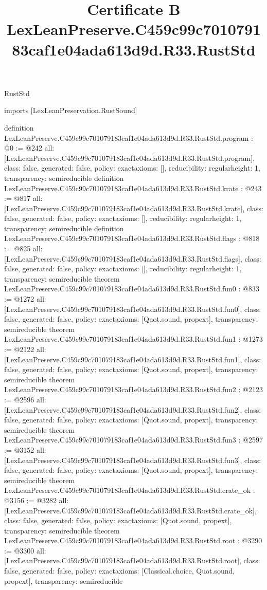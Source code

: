 \begin{lexlean}{RustStd}
\title{Certificate B LexLeanPreserve.C459c99c701079183caf1e04ada613d9d.R33.RustStd}
\begin{coremodule}
imports [LexLeanPreservation.RustSound]

definition LexLeanPreserve.C459c99c701079183caf1e04ada613d9d.R33.RustStd.program : @0 := @242 {
  all: [LexLeanPreserve.C459c99c701079183caf1e04ada613d9d.R33.RustStd.program],
  class: false,
  generated: false,
  policy: exact{axioms: []},
  reducibility: regular{height: 1},
  transparency: semireducible
}
definition LexLeanPreserve.C459c99c701079183caf1e04ada613d9d.R33.RustStd.krate : @243 := @817 {
  all: [LexLeanPreserve.C459c99c701079183caf1e04ada613d9d.R33.RustStd.krate],
  class: false,
  generated: false,
  policy: exact{axioms: []},
  reducibility: regular{height: 1},
  transparency: semireducible
}
definition LexLeanPreserve.C459c99c701079183caf1e04ada613d9d.R33.RustStd.flags : @818 := @825 {
  all: [LexLeanPreserve.C459c99c701079183caf1e04ada613d9d.R33.RustStd.flags],
  class: false,
  generated: false,
  policy: exact{axioms: []},
  reducibility: regular{height: 1},
  transparency: semireducible
}
theorem LexLeanPreserve.C459c99c701079183caf1e04ada613d9d.R33.RustStd.fun0 : @833 := @1272 {
  all: [LexLeanPreserve.C459c99c701079183caf1e04ada613d9d.R33.RustStd.fun0],
  class: false,
  generated: false,
  policy: exact{axioms: [Quot.sound, propext]},
  transparency: semireducible
}
theorem LexLeanPreserve.C459c99c701079183caf1e04ada613d9d.R33.RustStd.fun1 : @1273 := @2122 {
  all: [LexLeanPreserve.C459c99c701079183caf1e04ada613d9d.R33.RustStd.fun1],
  class: false,
  generated: false,
  policy: exact{axioms: [Quot.sound, propext]},
  transparency: semireducible
}
theorem LexLeanPreserve.C459c99c701079183caf1e04ada613d9d.R33.RustStd.fun2 : @2123 := @2596 {
  all: [LexLeanPreserve.C459c99c701079183caf1e04ada613d9d.R33.RustStd.fun2],
  class: false,
  generated: false,
  policy: exact{axioms: [Quot.sound, propext]},
  transparency: semireducible
}
theorem LexLeanPreserve.C459c99c701079183caf1e04ada613d9d.R33.RustStd.fun3 : @2597 := @3152 {
  all: [LexLeanPreserve.C459c99c701079183caf1e04ada613d9d.R33.RustStd.fun3],
  class: false,
  generated: false,
  policy: exact{axioms: [Quot.sound, propext]},
  transparency: semireducible
}
theorem LexLeanPreserve.C459c99c701079183caf1e04ada613d9d.R33.RustStd.crate_ok : @3156 := @3282 {
  all: [LexLeanPreserve.C459c99c701079183caf1e04ada613d9d.R33.RustStd.crate_ok],
  class: false,
  generated: false,
  policy: exact{axioms: [Quot.sound, propext]},
  transparency: semireducible
}
theorem LexLeanPreserve.C459c99c701079183caf1e04ada613d9d.R33.RustStd.root : @3290 := @3300 {
  all: [LexLeanPreserve.C459c99c701079183caf1e04ada613d9d.R33.RustStd.root],
  class: false,
  generated: false,
  policy: exact{axioms: [Classical.choice, Quot.sound, propext]},
  transparency: semireducible
}


\end{coremodule}
\end{lexlean}
